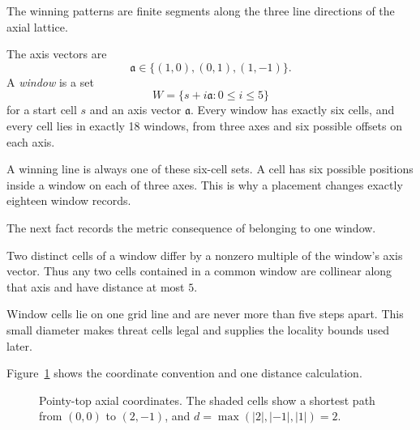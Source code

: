 The winning patterns are finite segments along the three line directions of
the axial lattice.

\begin{definition}
\label{def:D2}
The axis vectors are
\[
  \mathfrak a\in\{(1,0),(0,1),(1,-1)\}.
\]
A \emph{window} is a set
\[
  W=\{s+i\mathfrak a:0\le i\le5\}
\]
for a start cell $s$ and an axis vector $\mathfrak a$.  Every window has
exactly six cells, and every cell lies in exactly 18 windows, from three axes
and six possible offsets on each axis.
\end{definition}

\begin{plainterms}
A winning line is always one of these six-cell sets.  A cell has six possible
positions inside a window on each of three axes.  This is why a placement
changes exactly eighteen window records.
\end{plainterms}

The next fact records the metric consequence of belonging to one window.

\begin{fact}
\label{fact:F1}
Two distinct cells of a window differ by a nonzero multiple of the window's
axis vector.  Thus any two cells contained in a common window are collinear
along that axis and have distance at most $5$.
\end{fact}

\begin{plainterms}
Window cells lie on one grid line and are never more than five steps apart.
This small diameter makes threat cells legal and supplies the locality bounds
used later.
\end{plainterms}

Figure~\ref{fig:coordinates} shows the coordinate convention and one distance
calculation.

\begin{figure}[tbp]
  \centering
  \caption{Pointy-top axial coordinates.  The shaded cells show a shortest
  path from $(0,0)$ to $(2,-1)$, and
  $d=\max(|2|,|-1|,|1|)=2$.}
  \label{fig:coordinates}
\end{figure}


